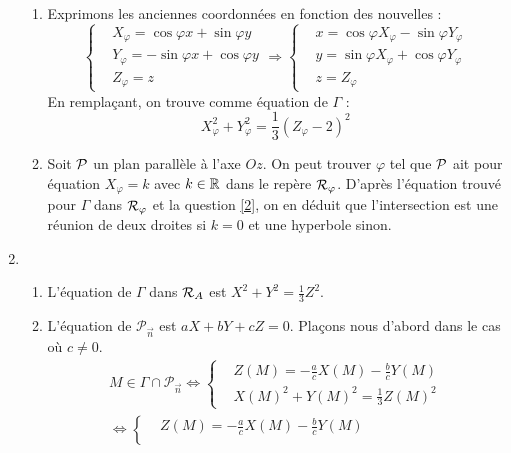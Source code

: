 \begin{enumerate}
\begin{enumerate}
\item Exprimons les anciennes coordonnées en fonction des nouvelles :
\begin{displaymath}
 \left\lbrace 
\begin{aligned}
 &X_\varphi = \cos \varphi x + \sin \varphi y \\
 &Y_\varphi = -\sin \varphi x + \cos \varphi y\\
 &Z_\varphi = z 
\end{aligned}
\right. 
\Rightarrow
 \left\lbrace 
\begin{aligned}
 &x = \cos \varphi X_\varphi - \sin \varphi Y_\varphi \\
 &y = \sin \varphi X_\varphi + \cos \varphi Y_\varphi \\
 &z = Z_\varphi 
\end{aligned}
\right. 
\end{displaymath}
En remplaçant, on trouve comme équation de $\Gamma$ :
\begin{displaymath}
 X_\varphi^2+Y_\varphi^2=\frac 13 (Z_\varphi-2)^2
\end{displaymath}
\item  Soit $\cal P$ un plan parallèle à l'axe $Oz$. On peut trouver $\varphi$ tel que $\cal P$ ait pour équation  $X_\varphi=k$  avec $k\in\mathbb{R}$ dans le repère ${\cal R}_\varphi$. D'après l'équation trouvé pour $\Gamma$ dans  ${\cal R}_\varphi$ et la question \ref{2}, on en déduit que  l'intersection est une réunion de deux droites si $k=0$ et une hyperbole sinon. 
\end{enumerate}
\item
\begin{enumerate}
\item L'équation de $\Gamma$ dans ${\cal R}_A$ est $X^2+Y^2=\frac 13 Z^2$.
\item L'équation de $\mathcal P_{\overrightarrow n}$ est $aX+bY+cZ=0$.\newline
Plaçons nous d'abord dans le cas où $c\neq 0$.
\begin{multline*}
 M\in \Gamma \cap \mathcal P_{\overrightarrow n} 
\Leftrightarrow
\left\lbrace
\begin{aligned}
 &Z(M) = -\frac{a}{c}X(M)-\frac{b}{c}Y(M)\\
 &X(M)^2 + Y(M)^2 = \frac{1}{3}Z(M)^2
\end{aligned}
 \right. \\
\Leftrightarrow
\left\lbrace
\begin{aligned}
 &Z(M) = -\frac{a}{c}X(M)-\frac{b}{c}Y(M)\\

\end{aligned}
\end{multline*}
\end{enumerate}
\end{enumerate}

